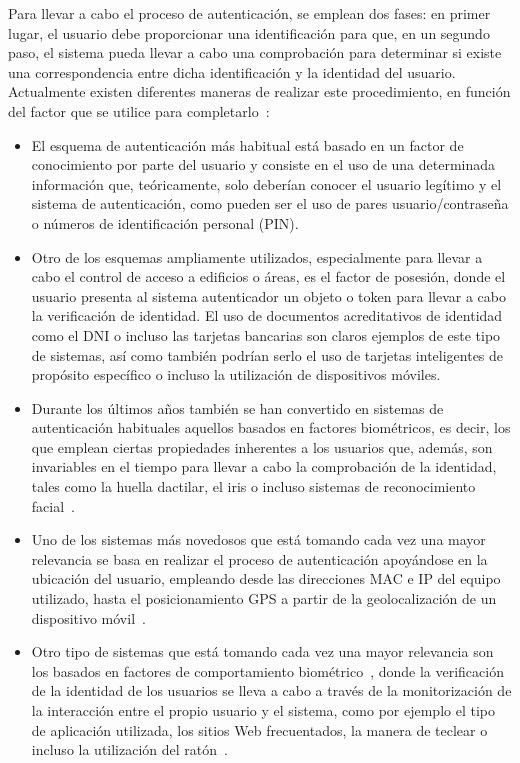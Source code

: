 Para llevar a cabo el proceso de autenticación, se emplean dos fases: en primer lugar, el usuario debe proporcionar una identificación para que, en un segundo paso, el sistema pueda llevar a cabo una comprobación para determinar si existe una correspondencia entre dicha identificación y la identidad del usuario. Actualmente existen diferentes maneras de realizar este procedimiento, en función del factor que se utilice para completarlo~\cite{barkadehi2018authentication}:

\begin{itemize}
    \item El esquema de autenticación más habitual está basado en un factor de conocimiento por parte del usuario y consiste en el uso de una determinada información que, teóricamente, solo deberían conocer el usuario legítimo y el sistema de autenticación, como pueden ser el uso de pares usuario/contraseña o números de identificación personal (PIN).
    \item Otro de los esquemas ampliamente utilizados, especialmente para llevar a cabo el control de acceso a edificios o áreas, es el factor de posesión, donde el usuario presenta al sistema autenticador un objeto o token para llevar a cabo la verificación de identidad. El uso de documentos acreditativos de identidad como el DNI o incluso las tarjetas bancarias son claros ejemplos de este tipo de sistemas, así como también podrían serlo el uso de tarjetas inteligentes de propósito específico o incluso la utilización de dispositivos móviles.
    \item Durante los últimos años también se han convertido en sistemas de autenticación habituales aquellos basados en factores biométricos, es decir, los que emplean ciertas propiedades inherentes a los usuarios que, además, son invariables en el tiempo para llevar a cabo la comprobación de la identidad, tales como la huella dactilar, el iris o incluso sistemas de reconocimiento facial~\cite{samangouei2017facial}.
    \item Uno de los sistemas más novedosos que está tomando cada vez una mayor relevancia se basa en realizar el proceso de autenticación apoyándose en la ubicación del usuario, empleando desde las direcciones MAC e IP del equipo utilizado, hasta el posicionamiento GPS a partir de la geolocalización de un dispositivo móvil~\cite{zhang2012location}.
    \item Otro tipo de sistemas que está tomando cada vez una mayor relevancia son los basados en factores de comportamiento biométrico~\cite{ahmed2005anomaly}, donde la verificación de la identidad de los usuarios se lleva a cabo a través de la monitorización de la interacción entre el propio usuario y el sistema, como por ejemplo el tipo de aplicación utilizada, los sitios Web frecuentados, la manera de teclear o incluso la utilización del ratón~\cite{bhatnagar2013survey,gamboa2003}.
\end{itemize}

